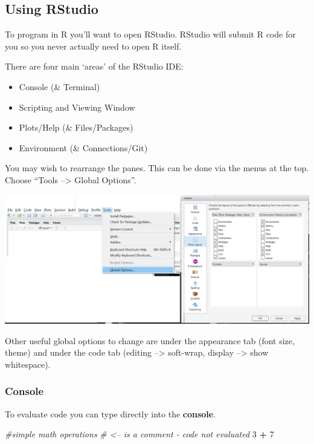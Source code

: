 \documentclass[
]{book}
\newenvironment{Shaded}{\begin{snugshade}}{\end{snugshade}}
\newcommand{\CommentTok}[1]{\textcolor[rgb]{0.56,0.35,0.01}{\textit{#1}}}
\newcommand{\DecValTok}[1]{\textcolor[rgb]{0.00,0.00,0.81}{#1}}
\newcommand{\OperatorTok}[1]{\textcolor[rgb]{0.81,0.36,0.00}{\textbf{#1}}}
\newcommand{\StringTok}[1]{\textcolor[rgb]{0.31,0.60,0.02}{#1}}
\theoremstyle{definition}
\theoremstyle{definition}
\theoremstyle{definition}
\theoremstyle{remark}
\begin{document}
\hypertarget{using-rstudio}{%
\subsection{Using RStudio}\label{using-rstudio}}

To program in R you'll want to open RStudio. RStudio will submit R code for you so you never actually need to open R itself.

There are four main `areas' of the RStudio IDE:

\begin{itemize}
\item
  Console (\& Terminal)
\item
  Scripting and Viewing Window
\item
  Plots/Help (\& Files/Packages)
\item
  Environment (\& Connections/Git)
\end{itemize}

You may wish to rearrange the panes. This can be done via the menus at the top. Choose ``Tools --\textgreater{} Global Options''.

\includegraphics[width=0.8\linewidth]{img/panes}

Other useful global options to change are under the appearance tab (font size, theme) and under the code tab (editing --\textgreater{} soft-wrap, display --\textgreater{} show whitespace).

\hypertarget{console}{%
\subsubsection{Console}\label{console}}

To evaluate code you can type directly into the \textbf{console}.

\begin{Shaded}
\begin{Highlighting}[]
\CommentTok{#simple math operations}
\CommentTok{# <-- is a comment - code not evaluated}
\DecValTok{3} \OperatorTok{+}\StringTok{ }\DecValTok{7}
\end{Highlighting}
\end{Shaded}
\end{document}
